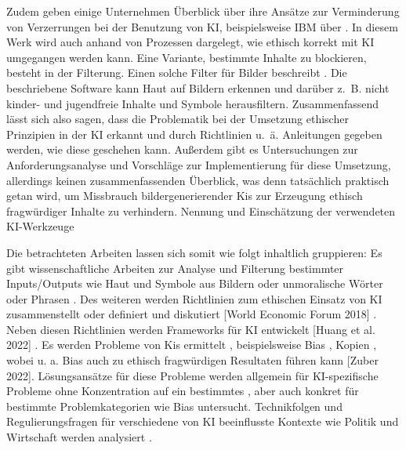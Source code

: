 Zudem geben einige Unternehmen Überblick über ihre Ansätze zur Verminderung von Verzerrungen bei der Benutzung von KI, 
beispielsweise IBM über \cite{Hobson}. In diesem Werk wird auch anhand von Prozessen dargelegt, wie ethisch korrekt mit KI 
umgegangen werden kann.
Eine Variante, bestimmte Inhalte zu blockieren, besteht in der Filterung. Einen solche Filter für Bilder beschreibt \cite{Zheng}.
Die beschriebene Software kann Haut auf Bildern erkennen und darüber z. B. nicht kinder- und jugendfreie Inhalte und Symbole herausfiltern.
Zusammenfassend lässt sich also sagen, dass die Problematik bei der Umsetzung ethischer Prinzipien in der KI erkannt und
durch Richtlinien u. ä. Anleitungen gegeben werden, wie diese geschehen kann. Außerdem gibt es Untersuchungen 
zur Anforderungsanalyse und Vorschläge zur Implementierung für diese Umsetzung, allerdings keinen zusammenfassenden 
Überblick, was denn tatsächlich praktisch getan wird, um Missbrauch bildergenerierender Kis zur Erzeugung ethisch 
fragwürdiger Inhalte zu verhindern.
Nennung und Einschätzung der verwendeten KI-Werkzeuge

Die betrachteten Arbeiten lassen sich somit wie folgt inhaltlich gruppieren: Es gibt wissenschaftliche Arbeiten zur Analyse und Filterung
bestimmter Inputs/Outputs wie Haut und Symbole aus Bildern \cite{Zheng} oder unmoralische Wörter oder Phrasen \cite{Shah}. Des weiteren 
werden Richtlinien zum ethischen Einsatz von KI zusammenstellt oder definiert und diskutiert \cite{Ayling} \cite{Srinivasan} 
\cite{Jameel} \cite{Hagendorff} \cite{Jobin} \cite{Unity} \cite{EUCommision}[World Economic Forum 2018] \cite{Mueller}.
Neben diesen Richtlinien werden Frameworks für KI entwickelt [Huang et al. 2022] \cite{Mueller}. Es werden Probleme von Kis ermittelt \cite{Ayling}, 
beispielsweise Bias \cite{Salminen} \cite{Jameel}, Kopien \cite{Somepalli}, wobei u. a. Bias auch zu ethisch 
fragwürdigen Resultaten führen kann [Zuber 2022]. Lösungsansätze für diese Probleme werden allgemein für KI-spezifische Probleme ohne 
Konzentration auf ein bestimmtes \cite{Ayling} \cite{Avelar}, aber auch konkret für bestimmte Problemkategorien wie Bias \cite{Srinivasan}
\cite{Jameel}untersucht. Technikfolgen und Regulierungsfragen für verschiedene von KI beeinflusste Kontexte wie Politik und Wirtschaft
werden analysiert \cite{Pawelec}.
